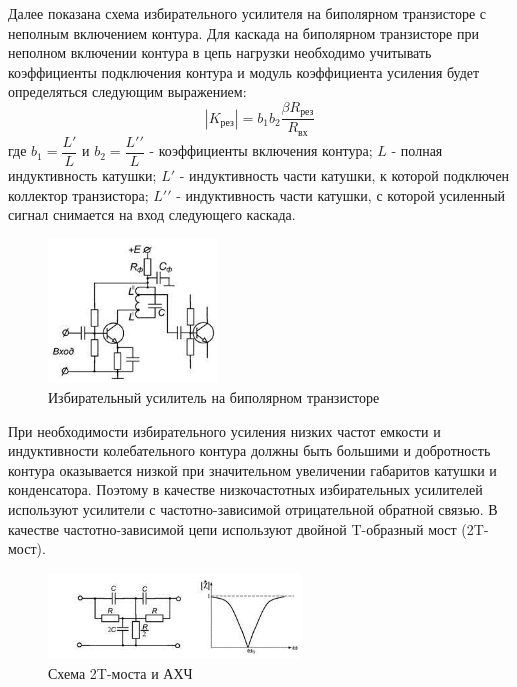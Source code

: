 \documentclass[unicode, 12pt, a4paper, oneside]{article}
\begin{document}
Далее показана схема избирательного усилителя на биполярном транзисторе с неполным включением контура. Для каскада на биполярном транзисторе при неполном включении контура в цепь нагрузки необходимо учитывать коэффициенты подключения контура и модуль коэффициента усиления будет определяться следующим выражением:
\begin{equation}
|K_\text{рез}| = b_{1}b_{2} \dfrac{\beta R_\text{рез}}{R_\text{вх}}
\end{equation}
где $ b_{1} = \dfrac{L\prime}{L} $ и $ b_{2} = \dfrac{L\prime\prime}{L} $ - коэффициенты включения контура; $L$ - полная индуктивность катушки; $L\prime$ - индуктивность части катушки, к которой подключен коллектор транзистора; $L\prime\prime$ - индуктивность части катушки, с которой усиленный сигнал снимается на вход следующего каскада.

\begin{figure}[H]
\centering
\includegraphics[width=0.4\textwidth]{7_bipolar_based_amp.jpg}
\caption{Избирательный усилитель на биполярном транзисторе}
\label{fig:7_bipolar_based_amp}
\end{figure}

При необходимости избирательного усиления низких частот емкости и индуктивности колебательного контура должны быть большими и добротность контура оказывается низкой при значительном увеличении габаритов катушки и конденсатора. Поэтому в качестве низкочастотных избирательных усилителей используют усилители с частотно-зависимой отрицательной обратной связью. В качестве частотно-зависимой цепи используют двойной T-образный мост (2T-мост).

\begin{figure}[H]
\centering
\includegraphics[width=0.6\textwidth]{7_2T.jpg}
\caption{Схема 2T-моста и АХЧ}
\label{fig:7_2T}
\end{figure}
\end{document}
